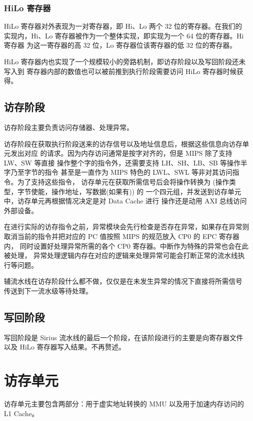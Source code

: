\documentclass[blue,normal,cn,hide]{elegantbook}
\begin{document}
\subsection{HiLo 寄存器}

HiLo 寄存器对外表现为一对寄存器，即 Hi、Lo 两个 32 位的寄存器。在我们的
实现内，Hi、Lo 寄存器被作为一个整体实现，即实现为一个 64 位的寄存器。Hi 寄存器
为这一寄存器的高 32 位，Lo 寄存器位该寄存器的低 32 位的寄存器。

HiLo 寄存器内也实现了一个规模较小的旁路机制，即访存阶段以及写回阶段还未写入到
寄存器内部的数值也可以被前推到执行阶段需要访问 HiLo 寄存器时候获得。

\section{访存阶段}

访存阶段主要负责访问存储器、处理异常。

访存阶段在获取执行阶段送来的访存信号以及地址信息后，根据这些信息向访存单元发出对应
的请求。因为内存访问通常是按字对齐的，但是 MIPS 除了支持 LW、SW 等直接
操作整个字的指令外，还需要支持 LH、SH、LB、SB 等操作半字乃至字节的指令
甚至是一直作为 MIPS 特色的 LWL、SWL 等非对其访问指令。为了支持这些指令，
访存单元在获取所需信号后会将操作转换为 (操作类型，字节使能，操作地址，写数据(如果有)) 的
一个四元组，并发送到访存单元中，访存单元再根据情况决定是对 Data Cache 进行
操作还是动用 AXI 总线访问外部设备。

在进行实际的访存指令之前，异常模块会先行检查是否存在异常，如果存在异常则
取消当前的指令并把对应的 PC 值按照 MIPS 的规范放入 CP0 的 EPC 寄存器内，
同时设置好处理异常所需的各个 CP0 寄存器。中断作为特殊的异常也会在此被处理，
异常处理逻辑内存在对应的逻辑来处理异常可能会打断正常的流水线执行等问题。

辅流水线在访存阶段什么都不做，仅仅是在未发生异常的情况下直接将所需信号
传送到下一流水级等待处理。

\section{写回阶段}

写回阶段是 Sirius 流水线的最后一个阶段，在该阶段进行的主要是向寄存器文件
以及 HiLo 寄存器写入结果。不再赘述。

\chapter{访存单元}

访存单元主要包含两部分：用于虚实地址转换的 MMU 以及用于加速内存访问的 L1 Cache。
\end{document}
